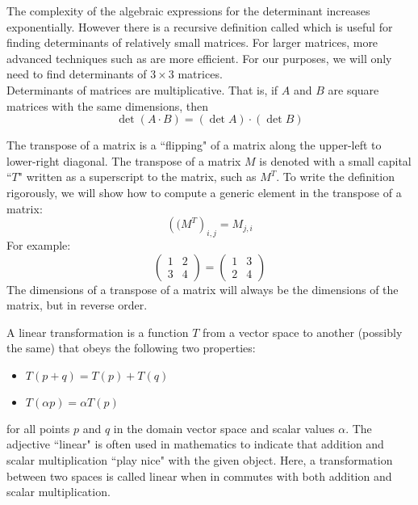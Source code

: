 The complexity of the algebraic expressions for the determinant increases exponentially. However there is a recursive definition called  which is useful for finding determinants of relatively small matrices. For larger matrices, more advanced techniques such as  are more efficient. For our purposes, we will only need to find determinants of $3\times 3$ matrices. \\

Determinants of matrices are multiplicative. That is, if $A$ and $B$ are square matrices with the same dimensions, then
\[
\det(A \cdot B)=(\det A) \cdot (\det B)
\]


The transpose of a matrix is a ``flipping" of a matrix along the upper-left to lower-right diagonal. The transpose of a matrix $M$ is denoted with a small capital ``$T$" written as a superscript to the matrix, such as $M^T$. To write the definition rigorously, we will show how to compute a generic element in the transpose of a matrix: \\
\[
\left((M^T\right)_{i,j}=M_{j,i}
\]
For example:
\[
\begin{pmatrix} 1 & 2 \\ 3 & 4 \end{pmatrix} = \begin{pmatrix} 1 & 3 \\ 2 & 4 \end{pmatrix}
\]
The dimensions of a transpose of a matrix will always be the dimensions of the matrix, but in reverse order. \\


A linear transformation is a function $T$ from a vector space to another (possibly the same)  that obeys the following two properties:
\begin{itemize}
\item $T(p+q)=T(p)+T(q)$
\item $T(\alpha p)=\alpha T(p)$
\end{itemize}
for all points $p$ and $q$ in the domain vector space and scalar values $\alpha$. The adjective ``linear" is often used in mathematics to indicate that addition and scalar multiplication ``play nice" with the given object. Here, a transformation between two spaces is called linear when in commutes with both addition and scalar multiplication. \\

